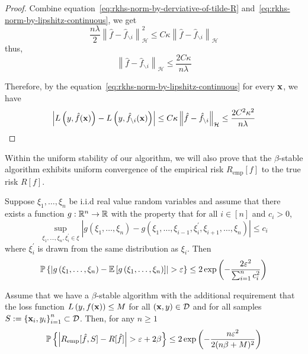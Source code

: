 \begin{proof}
	Combine equation~\eqref{eq:rkhs-norm-by-derviative-of-tilde-R} and~\eqref{eq:rkhs-norm-by-lipshitz-continuous}, we get
	\begin{equation}
		\frac{n\lambda}{2}\left\|\hat{f}-\hat{f}_{\backslash i}\right\|_{\mathcal{H}}^{2}\leq C\kappa\left\|\hat{f}-\hat{f}_{\backslash i}\right\|_{\mathcal{H}}
	\end{equation}
	thus,
	\begin{equation}
		\left\|\hat{f}-\hat{f}_{\backslash i}\right\|_{\mathcal{H}}\leq\frac{2C\kappa}{n\lambda}
	\end{equation}

	Therefore, by the equation~\eqref{eq:rkhs-norm-by-lipshitz-continuous} for every \(\mathbf{x}\), we have
	\begin{equation}
		\left|L\left(y,\hat{f}(\mathbf{x})\right)-L\left(y,\hat{f}_{\backslash i}(\mathbf{x})\right)\right|\leq C\kappa\left\|\hat{f}-\hat{f}_{\backslash i}\right\|_{\mathcal{H}}\leq\frac{2C^{2}\kappa^{2}}{n\lambda}
	\end{equation}
\end{proof}

Within the uniform stability of our algorithm, we will also prove that the \(\beta\)-stable algorithm exhibits uniform convergence of the empirical risk \(R_{\text{emp}}[f]\) to the true risk \(R[f]\).

\begin{theorem}\label{thm:McDiarmid-bound}
	Suppose \(\xi_{1},\ldots,\xi_{n}\) be i.i.d real value random variables and assume that there exists a function \(g:\mathbb{R}^{n}\rightarrow\mathbb{R}\) with the property that for all \(i\in[n]\) and \(c_{i}>0\),
	\begin{equation}
		\sup_{\xi_{1},\ldots,\xi_{n},\xi_{i}^{\prime}\in\xi}\left|g\left(\xi_{1},\ldots,\xi_{n}\right)-g\left(\xi_{1},\ldots,\xi_{i-1},\xi_{i}^{\prime},\xi_{i+1},\ldots,\xi_{n}\right)\right|\leq c_{i}
	\end{equation}
	where \(\xi_{i}^{\prime}\) is drawn from the same distribution as \(\xi_{i}\). Then
	\begin{equation}
		\bbP\left\{\left|g\left(\xi_{1},\ldots,\xi_{n}\right)-\bbE\left[g\left(\xi_{1},\ldots,\xi_{n}\right)\right]\right|>\varepsilon\right\}\leq 2\exp\left(-\frac{2\varepsilon^{2}}{\sum_{i=1}^{n}c_{i}^{2}}\right)
	\end{equation}
\end{theorem}

\begin{theorem}\label{thm:bousquet-and-elisseeff}
	Assume that we have a \(\beta\)-stable algorithm with the additional requirement that the loss function \(L\left(y,f(\mathbf{x})\right)\leq M\) for all \((\mathbf{x},y)\in\mathcal{D}\) and for all samples \(S:=\left\{\mathbf{x}_{i},y_{i}\right\}_{i=1}^{n}\subset\mathcal{D}\). Then, for any \(n\geq 1\)
	\begin{equation}
		\bbP\left\{\left|R_{\text{emp}}[\hat{f},S]-R[\hat{f}]\right|>\varepsilon+2\beta\right\}\leq 2\exp\left(-\frac{n\varepsilon^{2}}{2(n\beta+M)^{2}}\right)
	\end{equation}
\end{theorem}

